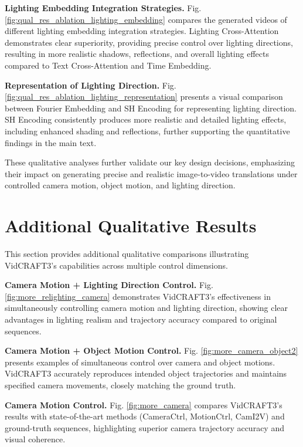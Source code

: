\noindent\textbf{Lighting Embedding Integration Strategies.}
Fig. \ref{fig:qual_res_ablation_lighting_embedding} compares the generated videos of different lighting embedding integration strategies. Lighting Cross-Attention demonstrates clear superiority, providing precise control over lighting directions, resulting in more realistic shadows, reflections, and overall lighting effects compared to Text Cross-Attention and Time Embedding.

\noindent\textbf{Representation of Lighting Direction.}
Fig. \ref{fig:qual_res_ablation_lighting_representation} presents a visual comparison between Fourier Embedding and SH Encoding for representing lighting direction. SH Encoding consistently produces more realistic and detailed lighting effects, including enhanced shading and reflections, further supporting the quantitative findings in the main text.

These qualitative analyses further validate our key design decisions, emphasizing their impact on generating precise and realistic image-to-video translations under controlled camera motion, object motion, and lighting direction.


\section{Additional Qualitative Results}

This section provides additional qualitative comparisons illustrating VidCRAFT3's capabilities across multiple control dimensions.

\noindent\textbf{Camera Motion + Lighting Direction Control.}
Fig. \ref{fig:more_relighting_camera} demonstrates VidCRAFT3's effectiveness in simultaneously controlling camera motion and lighting direction, showing clear advantages in lighting realism and trajectory accuracy compared to original sequences.

\noindent\textbf{Camera Motion + Object Motion Control.}
Fig. \ref{fig:more_camera_object2} presents examples of simultaneous control over camera and object motions. VidCRAFT3 accurately reproduces intended object trajectories and maintains specified camera movements, closely matching the ground truth.

\noindent\textbf{Camera Motion Control.}
Fig. \ref{fig:more_camera} compares VidCRAFT3's results with state-of-the-art methods (CameraCtrl, MotionCtrl, CamI2V) and ground-truth sequences, highlighting superior camera trajectory accuracy and visual coherence.

